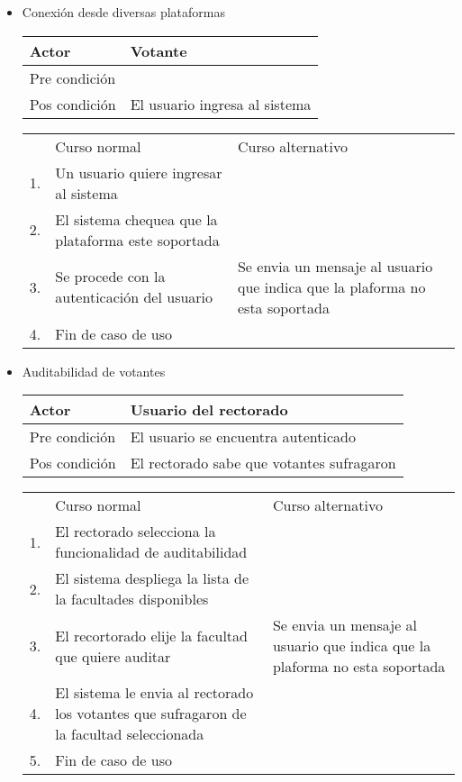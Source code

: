 \begin{itemize}
\bigskip
\item Conexi\'on desde diversas plataformas
\begin{center}
\begin{tabular}{ll}
Actor & Votante \\
\hline
Pre condición &  \\
\hline
Pos condición & El usuario ingresa al sistema \\
\hline
\end{tabular}
\medskip
\begin{tabular}{c p{4cm}|p{4cm}}
 & Curso normal & Curso alternativo \\
 1. & Un usuario quiere ingresar al sistema &   \\
 2. & El sistema chequea que la plataforma este soportada &   \\
 3. & Se procede con la autenticaci\'on del usuario & Se envia un mensaje al usuario que indica que la plaforma no esta soportada\\
 4. & Fin de caso de uso & \\
\end{tabular}
\end{center}

\bigskip
\item Auditabilidad de votantes
\begin{center}
\begin{tabular}{ll}
Actor & Usuario del rectorado \\
\hline
Pre condición & El usuario se encuentra autenticado\\
\hline
Pos condición & El rectorado sabe que votantes sufragaron \\
\hline
\end{tabular}
\medskip
\begin{tabular}{c p{4cm}|p{4cm}}
 & Curso normal & Curso alternativo \\
 1. & El rectorado selecciona la funcionalidad de auditabilidad &   \\
 2. & El sistema despliega la lista de la facultades disponibles &   \\
 3. & El recortorado elije la facultad que quiere auditar & Se envia un mensaje al usuario que indica que la plaforma no esta soportada\\
 4. & El sistema le envia al rectorado los votantes que sufragaron de la facultad seleccionada \\
 5. & Fin de caso de uso & \\
\end{tabular}
\end{center}



\end{itemize}